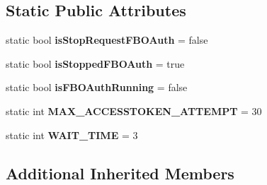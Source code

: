 \subsection*{Static Public Attributes}
\begin{DoxyCompactItemize}
\item 
\hypertarget{classcom_1_1shephertz_1_1app42_1_1paas_1_1sdk_1_1csharp_1_1social_1_1_social_service_a12a771073c195cc56b8d74499868ba4c}{static bool {\bfseries is\+Stop\+Request\+F\+B\+O\+Auth} = false}\label{classcom_1_1shephertz_1_1app42_1_1paas_1_1sdk_1_1csharp_1_1social_1_1_social_service_a12a771073c195cc56b8d74499868ba4c}

\item 
\hypertarget{classcom_1_1shephertz_1_1app42_1_1paas_1_1sdk_1_1csharp_1_1social_1_1_social_service_aa672e9ebc5e53ac102ccee89782a9fee}{static bool {\bfseries is\+Stopped\+F\+B\+O\+Auth} = true}\label{classcom_1_1shephertz_1_1app42_1_1paas_1_1sdk_1_1csharp_1_1social_1_1_social_service_aa672e9ebc5e53ac102ccee89782a9fee}

\item 
\hypertarget{classcom_1_1shephertz_1_1app42_1_1paas_1_1sdk_1_1csharp_1_1social_1_1_social_service_a351c9fe56a495317a1d5252de27dc8bf}{static bool {\bfseries is\+F\+B\+O\+Auth\+Running} = false}\label{classcom_1_1shephertz_1_1app42_1_1paas_1_1sdk_1_1csharp_1_1social_1_1_social_service_a351c9fe56a495317a1d5252de27dc8bf}

\item 
\hypertarget{classcom_1_1shephertz_1_1app42_1_1paas_1_1sdk_1_1csharp_1_1social_1_1_social_service_a7ef5682518c95c5d11faa55e8f7f3196}{static int {\bfseries M\+A\+X\+\_\+\+A\+C\+C\+E\+S\+S\+T\+O\+K\+E\+N\+\_\+\+A\+T\+T\+E\+M\+P\+T} = 30}\label{classcom_1_1shephertz_1_1app42_1_1paas_1_1sdk_1_1csharp_1_1social_1_1_social_service_a7ef5682518c95c5d11faa55e8f7f3196}

\item 
\hypertarget{classcom_1_1shephertz_1_1app42_1_1paas_1_1sdk_1_1csharp_1_1social_1_1_social_service_a19fcd6e2c108ac3e0e1559c537ac9880}{static int {\bfseries W\+A\+I\+T\+\_\+\+T\+I\+M\+E} = 3}\label{classcom_1_1shephertz_1_1app42_1_1paas_1_1sdk_1_1csharp_1_1social_1_1_social_service_a19fcd6e2c108ac3e0e1559c537ac9880}

\end{DoxyCompactItemize}
\subsection*{Additional Inherited Members}


